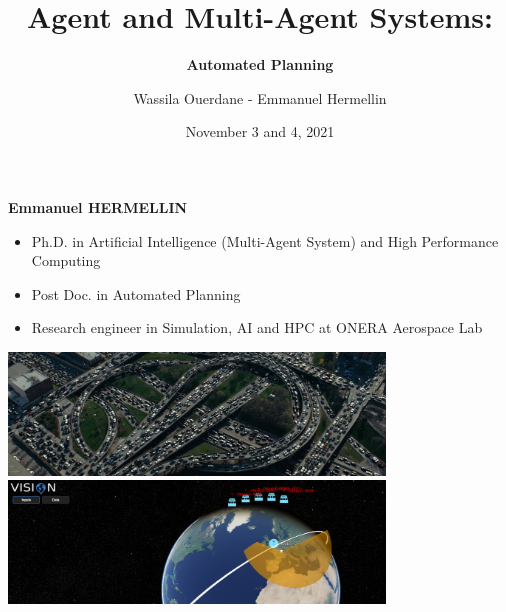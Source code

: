 \documentclass[9pt]{beamer}
\title[Multi-Agent Planning]{Agent and Multi-Agent Systems: }
\subtitle{{\bfseries \Large Automated Planning}}
\date{November 3 and 4, 2021}
\author[]{\vspace{2mm} Wassila Ouerdane - Emmanuel Hermellin}
\begin{document}
\begin{frame}
	\titlepage
\end{frame}

\begingroup
{}

\begin{frame}[noframenumbering]{}

\vspace{4mm}
\textbf{Emmanuel HERMELLIN}\\

\begin{small}
\begin{itemize}
\item Ph.D. in Artificial Intelligence (Multi-Agent System) and High Performance Computing
\item Post Doc. in Automated Planning
\item Research engineer in Simulation, AI and HPC at ONERA Aerospace Lab
\end{itemize}
\end{small}

\begin{center}
\includegraphics[keepaspectratio,width=0.75\textwidth]{images/deco1.jpg}
\includegraphics[keepaspectratio,width=0.75\textwidth]{images/deco2.jpg}
\end{center}

\end{frame}
\end{document}
